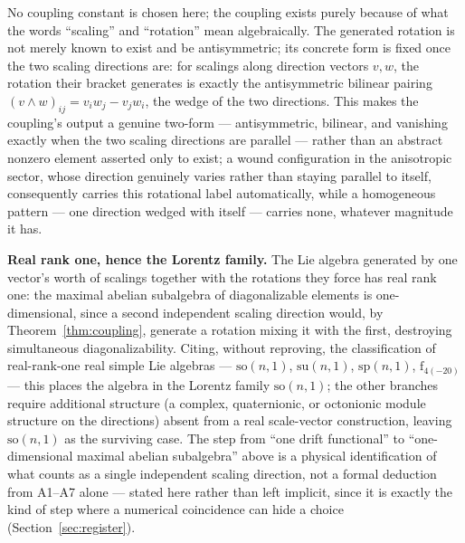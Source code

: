 \documentclass[pdflatex,sn-mathphys-num]{sn-jnl}
\theoremstyle{thmstyleone}
\theoremstyle{thmstylethree}
\theoremstyle{thmstyletwo}
\begin{document}
No coupling constant is chosen here; the coupling exists purely because
of what the words ``scaling'' and ``rotation'' mean algebraically. The
generated rotation is not merely known to exist and be antisymmetric;
its concrete form is fixed once the two scaling directions are: for
scalings along direction vectors $v,w$, the rotation their bracket
generates is exactly the antisymmetric bilinear pairing
$(v\wedge w)_{ij} = v_iw_j-v_jw_i$, the wedge of the two directions.
This makes the coupling's output a genuine two-form — antisymmetric,
bilinear, and vanishing exactly when the two scaling directions are
parallel — rather than an abstract nonzero element asserted only to
exist; a wound configuration in the anisotropic sector, whose direction
genuinely varies rather than staying parallel to itself, consequently
carries this rotational label automatically, while a homogeneous
pattern — one direction wedged with itself — carries none, whatever
magnitude it has.

\textbf{Real rank one, hence the Lorentz family.} The Lie algebra
generated by one vector's worth of scalings together with the rotations
they force has real rank one: the maximal abelian subalgebra of
diagonalizable elements is one-dimensional, since a second independent
scaling direction would, by Theorem~\ref{thm:coupling}, generate a
rotation mixing it with the first, destroying simultaneous
diagonalizability. Citing, without reproving, the classification of
real-rank-one real simple Lie algebras — $\mathrm{so}(n,1)$,
$\mathrm{su}(n,1)$, $\mathrm{sp}(n,1)$, $\mathrm{f}_{4(-20)}$ — this
places the algebra in the Lorentz family $\mathrm{so}(n,1)$; the other
branches require additional structure (a complex, quaternionic, or
octonionic module structure on the directions) absent from a real
scale-vector construction, leaving $\mathrm{so}(n,1)$ as the surviving
case. The step from ``one drift functional'' to ``one-dimensional
maximal abelian subalgebra'' above is a physical identification of what
counts as a single independent scaling direction, not a formal
deduction from A1–A7 alone — stated here rather than left implicit, since
it is exactly the kind of step where a numerical coincidence can hide a
choice (Section~\ref{sec:register}).
\end{document}
